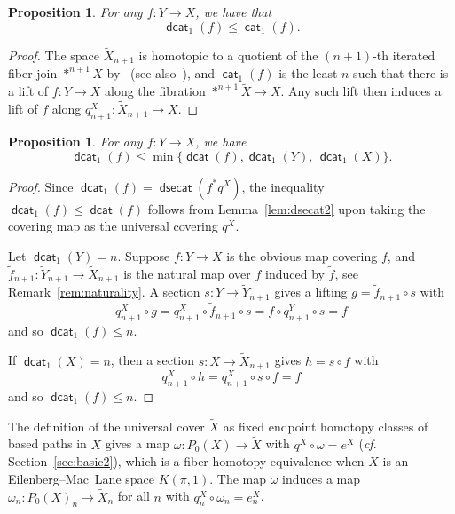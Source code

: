 \documentclass[amscd,amssymb,verbatim,11pt]{amsart}
\theoremstyle{plain}
\newtheorem{proposition}[thm]{Proposition}
\theoremstyle{definition}
\DeclareMathOperator{\cat}{{\mathsf{cat}}}
\DeclareMathOperator{\dsecat}{{\mathsf{dsecat}}}
\DeclareMathOperator{\dcat}{{\mathsf{dcat}}}
\def\wt{\widetilde}
\begin{document}
\begin{proposition}\label{prop:min1cat1}
For any $f:Y\to X$, we have that
$$\dcat_1(f) \leq \cat_1(f).
$$
\end{proposition}
\begin{proof}
The space $\widetilde X_{n+1}$ is homotopic to a quotient of the $(n+1)$-th iterated fiber join $\ast^{n+1} \widetilde X$ by~\cite{KK} (see also~\cite[Section 8]{Ja1}), and $\cat_1(f)$ is the least $n$ such that there is a lift of $f:Y\to X$ along the fibration $\ast^{n+1} \widetilde X \to X$. Any such lift then induces a lift of $f$ along $q_{n+1}^X\colon\widetilde X_{n+1} \to X$.
\end{proof}



\begin{proposition}\label{prop:min}
For any $f\colon Y \to X$, we have
\[
\dcat_1(f) \leq \min\{\dcat(f),\dcat_1(Y),\, \dcat_1(X)\}.
\]
\end{proposition}
\begin{proof}
Since $\dcat_1(f)=\dsecat(f^*q^X)$, the inequality $\dcat_1(f)\le\dcat(f)$ follows from Lemma~\ref{lem:dsecat2} upon taking the covering map as the universal covering $q^X$.

Let $\dcat_1(Y)=n$. Suppose $\wt{f}\colon \wt Y\to \wt X$ is the obvious map covering $f$, and $\wt{f}_{n+1}\colon \wt{Y}_{n+1}\to \wt{X}_{n+1}$ is the natural map over $f$ induced by $\wt f$, see Remark~\ref{rem:naturality}.
A section $s\colon Y \to \widetilde Y_{n+1}$ gives a lifting $g =
\wt{f}_{n+1} \circ s$ with
\[
q_{n+1}^X \circ  g = q_{n+1}^X \circ \wt{f}_{n+1} \circ s = f\circ q_{n+1}^Y \circ s = f
\]
and so $\dcat_1(f) \leq n$.

If $\dcat_1(X)=n$, then a section $s\colon X \to \widetilde X_{n+1}$ gives $h = s\circ f$
with
$$q_{n+1}^X \circ h = q_{n+1}^X\circ s \circ f = f$$
and so $\dcat_1(f) \leq n$.
\end{proof}


The definition of the universal cover $\widetilde X$ as fixed endpoint homotopy classes of based paths in
$X$ gives a map $\omega\colon P_0(X) \to \widetilde X$ with $q^X \circ \omega = e^X$ (\emph{cf}. Section~\ref{sec:basic2}), which is a fiber homotopy
equivalence when $X$ is an Eilenberg--Mac~Lane space $K(\pi,1)$. The map $\omega$ induces a map $\omega_n\colon P_0(X)_n \to \widetilde X_n$ for all $n$
with $q_n^X \circ \omega_n = e_n^X$.
\end{document}
